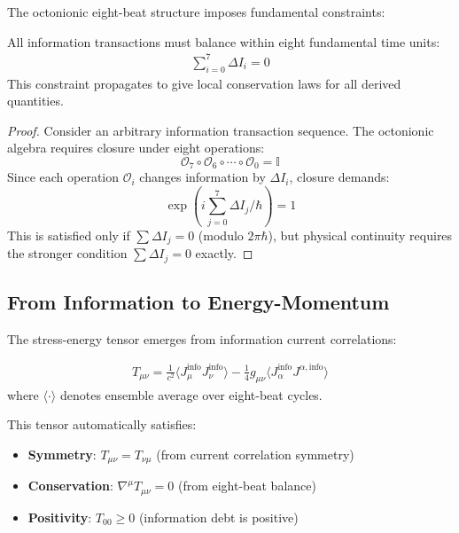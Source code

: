 \documentclass[12pt]{article}
\begin{document}
The octonionic eight-beat structure imposes fundamental constraints:

\begin{theorem}
All information transactions must balance within eight fundamental time units:
\begin{align}
\sum_{i=0}^{7} \Delta I_i = 0
\end{align}
This constraint propagates to give local conservation laws for all derived quantities.
\end{theorem}

\begin{proof}
Consider an arbitrary information transaction sequence. The octonionic algebra requires closure under eight operations:
\begin{equation}
\mathcal{O}_7 \circ \mathcal{O}_6 \circ \cdots \circ \mathcal{O}_0 = \mathbb{I}
\end{equation}
Since each operation $\mathcal{O}_i$ changes information by $\Delta I_i$, closure demands:
\begin{equation}
\exp\left(i\sum_{j=0}^{7} \Delta I_j / \hbar\right) = 1
\end{equation}
This is satisfied only if $\sum \Delta I_j = 0$ (modulo $2\pi\hbar$), but physical continuity requires the stronger condition $\sum \Delta I_j = 0$ exactly.
\end{proof}

\subsection{From Information to Energy-Momentum}

The stress-energy tensor emerges from information current correlations:

\begin{theorem}
\begin{align}
T_{\mu\nu} = \frac{1}{c^2} \langle J_{\mu}^{\text{info}} J_{\nu}^{\text{info}} \rangle - \frac{1}{4}g_{\mu\nu} \langle J_\alpha^{\text{info}} J^{\alpha,\text{info}} \rangle
\end{align}
where $\langle \cdot \rangle$ denotes ensemble average over eight-beat cycles.
\end{theorem}

This tensor automatically satisfies:
\begin{itemize}
\item \textbf{Symmetry}: $T_{\mu\nu} = T_{\nu\mu}$ (from current correlation symmetry)
\item \textbf{Conservation}: $\nabla^\mu T_{\mu\nu} = 0$ (from eight-beat balance)
\item \textbf{Positivity}: $T_{00} \geq 0$ (information debt is positive)
\end{itemize}
\end{document}
